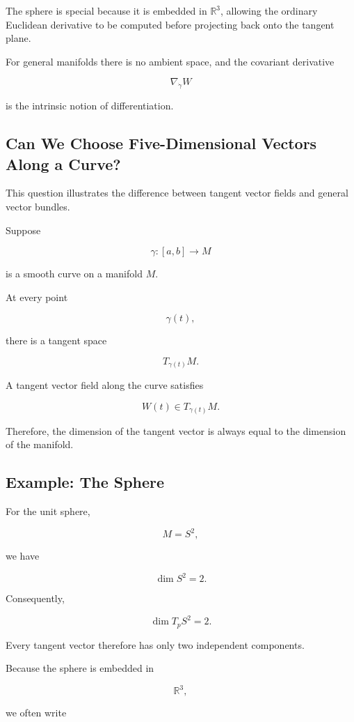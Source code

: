 \documentclass[12pt,a4paper]{article}
\theoremstyle{notespace}
\begin{document}
The sphere is special because it is embedded in \(\mathbb{R}^3\), allowing
the ordinary Euclidean derivative to be computed before projecting back
onto the tangent plane.

For general manifolds there is no ambient space, and the covariant
derivative

\[
\boxed{
	\nabla_{\dot\gamma}W
}
\]

is the intrinsic notion of differentiation.


\subsection{Can We Choose Five-Dimensional Vectors Along a Curve?}

This question illustrates the difference between tangent vector fields and
general vector bundles.

Suppose

\[
\gamma:[a,b]\longrightarrow M
\]

is a smooth curve on a manifold \(M\).

At every point

\[
\gamma(t),
\]

there is a tangent space

\[
T_{\gamma(t)}M.
\]

A tangent vector field along the curve satisfies

\[
\boxed{
	W(t)\in T_{\gamma(t)}M.
}
\]

Therefore, the dimension of the tangent vector is always equal to the
dimension of the manifold.


\subsection{Example: The Sphere}

For the unit sphere,

\[
M=S^2,
\]

we have

\[
\dim S^2=2.
\]

Consequently,

\[
\boxed{
	\dim T_pS^2=2.
}
\]

Every tangent vector therefore has only two independent components.

Because the sphere is embedded in

\[
\mathbb R^3,
\]

we often write
\end{document}
